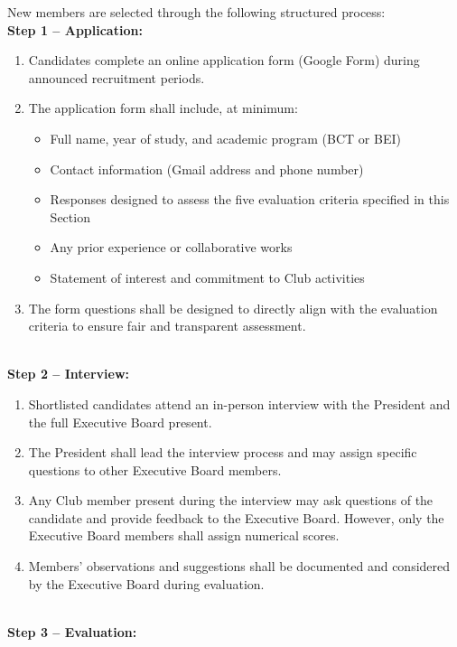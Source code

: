 New members are selected through the following structured process:
\\
\textbf{Step 1 -- Application:}
\begin{enumerate}[label=\alph*), leftmargin=2em, itemsep=0.3em]
    \item Candidates complete an online application form (Google Form) during announced recruitment periods.
    \item The application form shall include, at minimum:
    \begin{itemize}[leftmargin=1.5em, itemsep=0.2em]
        \item Full name, year of study, and academic program (BCT or BEI)
        \item Contact information (Gmail address and phone number)
        \item Responses designed to assess the five evaluation criteria specified in this Section
        \item Any prior experience or collaborative works
        \item Statement of interest and commitment to Club activities
    \end{itemize}
    \item The form questions shall be designed to directly align with the evaluation criteria to ensure fair and transparent assessment.
\end{enumerate}
\\
\textbf{Step 2 -- Interview:}
\begin{enumerate}[label=\alph*), leftmargin=2em, itemsep=0.3em]
    \item Shortlisted candidates attend an in-person interview with the President and the full Executive Board present.
    \item The President shall lead the interview process and may assign specific questions to other Executive Board members.
    \item Any Club member present during the interview may ask questions of the candidate and provide feedback to the Executive Board. However, only the Executive Board members shall assign numerical scores.
    \item Members' observations and suggestions shall be documented and considered by the Executive Board during evaluation.
\end{enumerate}
\\
\textbf{Step 3 -- Evaluation:}

